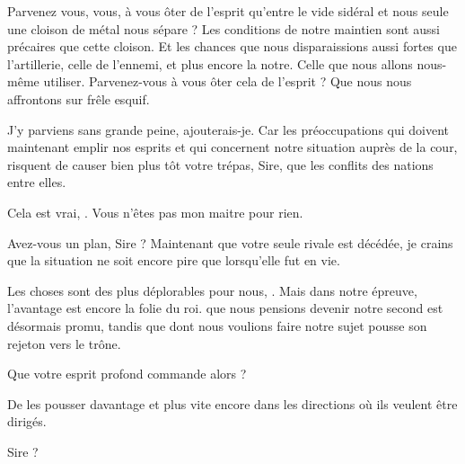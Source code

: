 \begin{drama}
  Parvenez vous, vous, à vous ôter de l’esprit qu’entre le vide sidéral et nous seule une cloison de métal nous sépare ? Les conditions de notre maintien sont aussi précaires que cette cloison. Et les chances que nous disparaissions aussi fortes que l’artillerie, celle de l’ennemi, et plus encore la notre. Celle que nous allons nous-même utiliser. Parvenez-vous à vous ôter cela de l’esprit ? Que nous nous affrontons sur frêle esquif.

  \alexasspeaks J’y parviens sans grande peine,  ajouterais-je. Car les préoccupations qui doivent maintenant emplir nos esprits et qui concernent notre situation auprès de la cour, risquent de causer bien plus tôt votre trépas, Sire, que les conflits des nations entre elles.

  \elenaspeaks Cela est vrai, \alexas. Vous n’êtes pas mon maitre pour rien.

  \alexasspeaks Avez-vous un plan, Sire ? Maintenant que votre seule rivale est décédée, je crains que la situation ne soit encore pire que lorsqu’elle fut en vie.

  \elenaspeaks Les choses sont des plus déplorables pour nous, \alexas. Mais dans notre épreuve, l’avantage est encore la folie du roi. \general{} que nous pensions devenir notre second est désormais promu, tandis que \reine{} dont nous voulions faire notre sujet pousse son rejeton vers le trône.

  \alexasspeaks Que votre esprit profond commande alors ?

  \elenaspeaks De les pousser davantage et plus vite encore dans les directions où ils veulent être dirigés.


  \alexasspeaks {} Sire ?
\end{drama}


\scene

\StageDirII{\elena, \general}


